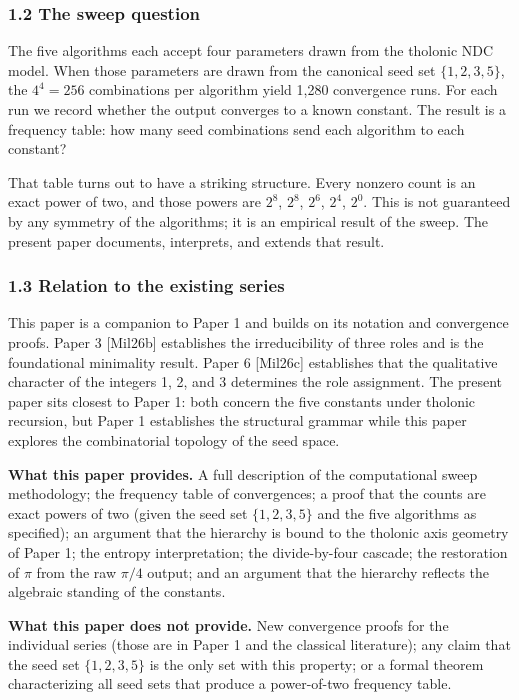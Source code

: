 \documentclass[
  11pt,
  letterpaper,
]{article}
\begin{document}
\subsubsection{1.2 The sweep question}\label{the-sweep-question}

The five algorithms each accept four parameters drawn from the tholonic
NDC model. When those parameters are drawn from the canonical seed set
\(\{1, 2, 3, 5\}\), the \(4^4 = 256\) combinations per algorithm yield
1,280 convergence runs. For each run we record whether the output
converges to a known constant. The result is a frequency table: how many
seed combinations send each algorithm to each constant?

That table turns out to have a striking structure. Every nonzero count
is an exact power of two, and those powers are \(2^8\), \(2^8\),
\(2^6\), \(2^4\), \(2^0\). This is not guaranteed by any symmetry of the
algorithms; it is an empirical result of the sweep. The present paper
documents, interprets, and extends that result.

\subsubsection{1.3 Relation to the existing
series}\label{relation-to-the-existing-series}

This paper is a companion to Paper 1 and builds on its notation and
convergence proofs. Paper 3 {[}Mil26b{]} establishes the irreducibility
of three roles and is the foundational minimality result. Paper 6
{[}Mil26c{]} establishes that the qualitative character of the integers
1, 2, and 3 determines the role assignment. The present paper sits
closest to Paper 1: both concern the five constants under tholonic
recursion, but Paper 1 establishes the structural grammar while this
paper explores the combinatorial topology of the seed space.

\textbf{What this paper provides.} A full description of the
computational sweep methodology; the frequency table of convergences; a
proof that the counts are exact powers of two (given the seed set
\(\{1, 2, 3, 5\}\) and the five algorithms as specified); an argument
that the hierarchy is bound to the tholonic axis geometry of Paper 1;
the entropy interpretation; the divide-by-four cascade; the restoration
of \(\pi\) from the raw \(\pi/4\) output; and an argument that the
hierarchy reflects the algebraic standing of the constants.

\textbf{What this paper does not provide.} New convergence proofs for
the individual series (those are in Paper 1 and the classical
literature); any claim that the seed set \(\{1, 2, 3, 5\}\) is the only
set with this property; or a formal theorem characterizing all seed sets
that produce a power-of-two frequency table.
\end{document}
